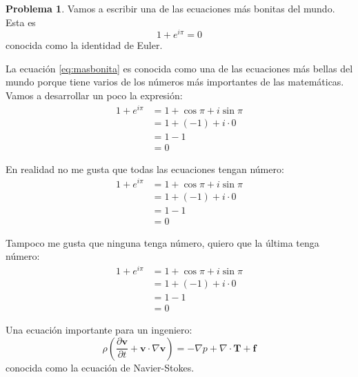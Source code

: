 \documentclass[10pt]{article}
\theoremstyle{definition}
\theoremstyle{remark}
\theoremstyle{definition}
\newtheorem{prob}{Problema}
\newcommand{\pd}[2]{\frac{\partial #1}{ \partial #2}}   %
\renewcommand{\vec}[1]{\boldsymbol{#1}}
\newcommand{\ten}[1]{\boldsymbol{#1}}
\begin{document}
\begin{prob} Vamos a escribir una de las ecuaciones más bonitas del mundo. Esta es
\begin{equation}
	1 + e^{i\pi} = 0
	\label{eq:masbonita}
\end{equation}
conocida como la identidad de Euler.

La ecuación \eqref{eq:masbonita} es conocida como una de las ecuaciones más bellas del mundo porque tiene varios de los números más importantes de las matemáticas. Vamos a desarrollar un poco la expresión:
\begin{align}
	1+e^{i\pi} & = 1 + \cos \pi + i \sin \pi \\
	& = 1 + (-1) + i \cdot 0 \\
	& = 1 - 1 \\
	& = 0
\end{align}

En realidad no me gusta que todas las ecuaciones tengan número:
\begin{align*}  %
	1+e^{i\pi} & = 1 + \cos \pi + i \sin \pi \\
	& = 1 + (-1) + i \cdot 0 \\
	& = 1 - 1 \\
	& = 0
\end{align*}

Tampoco me gusta que ninguna tenga número, quiero que la última tenga número:
\begin{align}
	1+e^{i\pi} & = 1 + \cos \pi + i \sin \pi \nonumber \\
	& = 1 + (-1) + i \cdot 0 \nonumber \\
	& = 1 - 1 \nonumber \\
	& = 0
\end{align}

Una ecuación importante para un ingeniero:
\begin{equation}
	\rho \left(\pd{\vec{v}}{t} + \vec{v} \cdot \nabla \vec{v} \right) = - \nabla p + \nabla \cdot \ten{T} + \ten f
\label{eq:ns}
\end{equation}
conocida como la ecuación de Navier-Stokes.


\end{prob}
\end{document}
